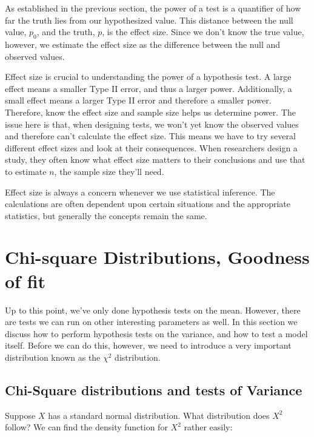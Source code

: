 As established in the previous section, the power of a test is a quantifier of how far the truth lies from our hypothesized value. This distance between the null value, $p_0$, and the truth, $p$, is the effect size. Since we don't know the true value, however, we estimate the effect size as the difference between the null and observed values.

Effect size is crucial to understanding the power of a hypothesis test. A large effect means a smaller Type II error, and thus a larger power. Additionally, a small effect means a larger Type II error and therefore a smaller power. Therefore, know the effect size and sample size helps us determine power. The issue here is that, when designing tests, we won't yet know the observed values and therefore can't calculate the effect size. This means we have to try several different effect sizes and look at their consequences. When researchers design a study, they often know what effect size matters to their conclusions and use that to estimate $n$, the sample size they'll need.

Effect size is always a concern whenever we use statistical inference. The calculations are often dependent upon certain situations and the appropriate statistics, but generally the concepts remain the same.

\section{Chi-square Distributions, Goodness of fit} \label{sec:ChiSquare}

Up to this point, we've only done hypothesis tests on the mean.  However, there are tests we can run on other interesting parameters as well.  In this section we discuss how to perform hypothesis tests on the variance, and how to test a model itself.  Before we can do this, however, we need to introduce a very important distribution known as the $\chi^2$ distribution.


\subsection{Chi-Square distributions and tests of Variance}

Suppose $X$ has a standard normal distribution.  What distribution does $X^2$ follow?  We can find the density function for $X^2$ rather easily:

